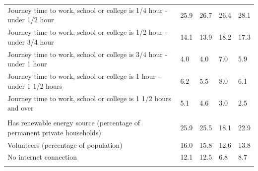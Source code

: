 \documentclass{article}
\begin{document}
\begin{table}[h]
\begin{tabular}{KTTTT}
Journey time to work, school or college is 1/4 hour - under 1/2 hour & 25.9& 26.7& 26.4& 28.1\\
Journey time to work, school or college is 1/2 hour - under 3/4 hour & 14.1& 13.9& 18.2& 17.3\\
Journey time to work, school or college is 3/4 hour - under 1 hour & 4.0& 4.0& 7.0& 5.9\\
Journey time to work, school or college is 1 hour - under 1 1/2 hours & 6.2& 5.5& 8.0& 6.1\\
Journey time to work, school or college is 1 1/2 hours and over & 5.1& 4.6& 3.0& 2.5\\
\hline
    \\ 
    \hline
Has renewable energy source (percentage of permanent private households) & 25.9& 25.5& 18.1& 22.9\\
    \hline
Volunteers (percentage of population) & 16.0& 15.8& 12.6& 13.8\\
    \hline
No internet connection& 12.1& 12.5&  6.8&  8.7\\
\hline
\end{tabular}
\end{table}
\end{document}
